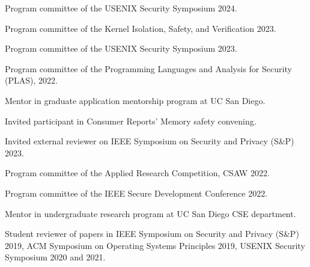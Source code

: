 { Program committee of the USENIX Security Symposium 2024. }

{ Program committee of the Kernel Isolation, Safety, and Verification 2023. }

{ Program committee of the USENIX Security Symposium 2023. }

{ Program committee of the Programming Languages and Analysis for Security (PLAS), 2022. }

{ Mentor in 
graduate application mentorship program at UC San Diego. }

{ Invited participant in Consumer Reports' Memory safety convening. }

{ Invited external reviewer on IEEE Symposium on Security and Privacy (S\&P) 2023.}

{ Program committee of the Applied Research Competition, CSAW 2022. }

{ Program committee of the IEEE Secure Development Conference 2022. }

{ Mentor in  undergraduate research program at UC San Diego CSE department. }

{ Student reviewer of papers in IEEE Symposium on Security and Privacy (S\&P)
2019, ACM Symposium on Operating Systems Principles 2019, USENIX Security
Symposium 2020 and 2021. }
